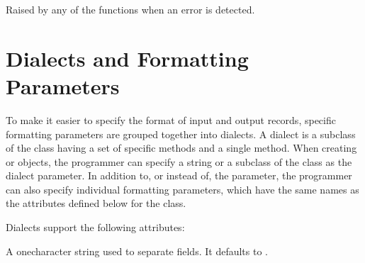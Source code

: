 \documentclass[letterpaper,10pt,english]{sphinxmanual}
\begin{document}
\vspace{5px}

\begin{fulllineitems}
\label{\detokenize{csv:csv.Error}}
Raised by any of the functions when an error is detected.

\end{fulllineitems}



\section{Dialects and Formatting Parameters}
\label{\detokenize{csv:dialects-and-formatting-parameters}}\label{\detokenize{csv:csv-fmt-params}}
To make it easier to specify the format of input and output records, specific
formatting parameters are grouped together into dialects.  A dialect is a
subclass of the {\hyperref[\detokenize{csv:csv.Dialect}]{}} class having a set of specific methods and a
single  method.  When creating {\hyperref[\detokenize{csv:csv.reader}]{}} or
{\hyperref[\detokenize{csv:csv.writer}]{}} objects, the programmer can specify a string or a subclass of
the {\hyperref[\detokenize{csv:csv.Dialect}]{}} class as the dialect parameter.  In addition to, or instead
of, the  parameter, the programmer can also specify individual
formatting parameters, which have the same names as the attributes defined below
for the {\hyperref[\detokenize{csv:csv.Dialect}]{}} class.

Dialects support the following attributes:

\vspace{5px}

\begin{fulllineitems}
\label{\detokenize{csv:csv.Dialect.delimiter}}
A one\sphinxhyphen{}character string used to separate fields.  It defaults to \sphinxcode{\sphinxupquote{\textquotesingle{},\textquotesingle{}}}.

\end{fulllineitems}
\end{document}
